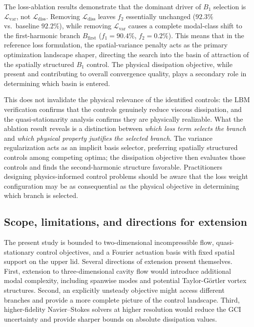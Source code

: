 \documentclass[a4paper,11pt]{article}
\begin{document}
The loss-ablation results demonstrate that the dominant driver of \(B_1\) selection
is \(\mathcal{L}_{\mathrm{var}}\), not \(\mathcal{L}_{\mathrm{diss}}\). Removing
\(\mathcal{L}_{\mathrm{diss}}\) leaves \(f_2\) essentially unchanged (\(92.3\%\)
vs.\ baseline \(92.2\%\)), while removing \(\mathcal{L}_{\mathrm{var}}\) causes a
complete modal-class shift to the first-harmonic branch \(B_{\mathrm{first}}\)
(\(f_1=90.4\%\), \(f_2=0.2\%\)). This means that in the reference loss
formulation, the spatial-variance penalty acts as the primary optimization landscape
shaper, directing the search into the basin of attraction of the spatially structured
\(B_1\) control. The physical dissipation objective, while present and contributing
to overall convergence quality, plays a secondary role in determining which basin
is entered.

This does not invalidate the physical relevance of the identified controls: the
LBM verification confirms that the controls genuinely reduce viscous dissipation,
and the quasi-stationarity analysis confirms they are physically realizable. What
the ablation result reveals is a distinction between \emph{which loss term selects
the branch} and \emph{which physical property justifies the selected branch}.
The variance regularization acts as an implicit basis selector, preferring spatially
structured controls among competing optima; the dissipation objective then evaluates
those controls and finds the second-harmonic structure favorable. Practitioners
designing physics-informed control problems should be aware that the loss weight
configuration may be as consequential as the physical objective in determining which
branch is selected.

\subsection{Scope, limitations, and directions for extension}

The present study is bounded to two-dimensional incompressible flow, quasi-stationary
control objectives, and a Fourier actuation basis with fixed spatial support on the
upper lid. Several directions of extension present themselves. First, extension to
three-dimensional cavity flow would introduce additional modal complexity, including
spanwise modes and potential Taylor-G\"{o}rtler vortex structures. Second, an
explicitly unsteady objective might access different branches and provide a more
complete picture of the control landscape. Third, higher-fidelity Navier--Stokes
solvers at higher resolution would reduce the GCI uncertainty and provide sharper
bounds on absolute dissipation values.
\end{document}
